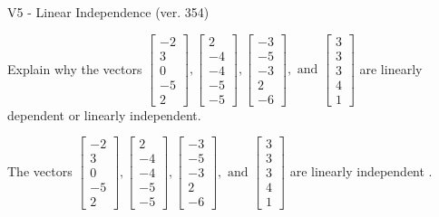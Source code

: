 \begin{exercise}
  \begin{exerciseTitle}V5 - Linear Independence (ver. 354)\end{exerciseTitle}
  \begin{exerciseStatement}
    Explain why the vectors \(\left[\begin{array}{r}
-2 \\
3 \\
0 \\
-5 \\
2
\end{array}\right] , \left[\begin{array}{r}
2 \\
-4 \\
-4 \\
-5 \\
-5
\end{array}\right] , \left[\begin{array}{r}
-3 \\
-5 \\
-3 \\
2 \\
-6
\end{array}\right] , \text{ and } \left[\begin{array}{r}
3 \\
3 \\
3 \\
4 \\
1
\end{array}\right]\) are linearly dependent or linearly independent.	


  \end{exerciseStatement}
  \begin{exerciseAnswer}
   The vectors \(\left[\begin{array}{r}
-2 \\
3 \\
0 \\
-5 \\
2
\end{array}\right] , \left[\begin{array}{r}
2 \\
-4 \\
-4 \\
-5 \\
-5
\end{array}\right] , \left[\begin{array}{r}
-3 \\
-5 \\
-3 \\
2 \\
-6
\end{array}\right] , \text{ and } \left[\begin{array}{r}
3 \\
3 \\
3 \\
4 \\
1
\end{array}\right]\) are 
  	 linearly independent  .
  


  \end{exerciseAnswer}
\end{exercise}